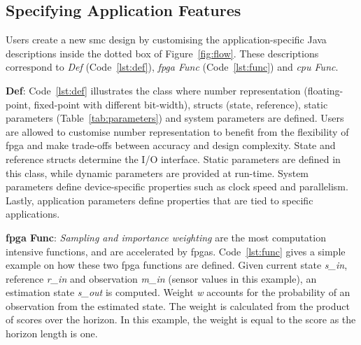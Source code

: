 \subsection{Specifying Application Features}
\label{sec:flow_kernel}

Users create a new \gls{smc} design by customising the application-specific Java descriptions inside the dotted box of Figure~\ref{fig:flow}.
These descriptions correspond to \textit{Def} (Code~\ref{lst:def}), \textit{\gls{fpga} Func} (Code~\ref{lst:func}) and \textit{\gls{cpu} Func}.

\textbf{Def}: Code~\ref{lst:def} illustrates the class where number representation (floating-point, fixed-point with different bit-width), structs (state, reference), static parameters (Table~\ref{tab:parameters}) and system parameters are defined.
Users are allowed to customise number representation to benefit from the flexibility of \gls{fpga} and make trade-offs between accuracy and design complexity.
State and reference structs determine the I/O interface.
Static parameters are defined in this class, while dynamic parameters are provided at run-time.
System parameters define device-specific properties such as clock speed and parallelism.
Lastly, application parameters define properties that are tied to specific applications.

\textbf{\gls{fpga} Func}: \textit{Sampling and importance weighting} are the most computation intensive functions, and are accelerated by \glspl{fpga}.
Code~\ref{lst:func} gives a simple example on how these two \gls{fpga} functions are defined.
Given current state \textit{s\_in}, reference \textit{r\_in} and observation \textit{m\_in} (sensor values in this example), an estimation state \textit{s\_out} is computed.
Weight \textit{w} accounts for the probability of an observation from the estimated state.
The weight is calculated from the product of scores over the horizon.
In this example, the weight is equal to the score as the horizon length is one. 

